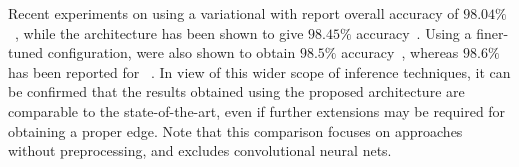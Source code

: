 Recent experiments on \mnist using a variational \gp with \mcmc report overall accuracy of $98.04\%$~\cite{Hensman15}, while the \autogp architecture has been shown to give $98.45\%$ accuracy~\cite{Krauth17}.
Using a finer-tuned configuration,  were also shown to obtain $98.5\%$ accuracy~\cite{Simard03}, whereas $98.6\%$ has been reported for ~\cite{Scholkopf97}.
In view of this wider scope of inference techniques, it can be confirmed that the results obtained using the proposed architecture are comparable to the state-of-the-art, even if further extensions may be required for obtaining a proper edge.
Note that this comparison focuses on approaches without preprocessing, and excludes convolutional neural nets.



